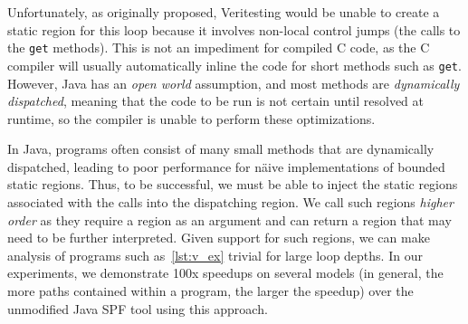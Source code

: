 Unfortunately, as originally proposed, Veritesting would be unable to create a static region for this loop because it involves non-local control jumps (the calls to the \texttt{get} methods).  This is not an impediment for compiled C code, as the C compiler will usually automatically inline the code for short methods such as \texttt{get}.  However, Java has an {\em open world} assumption, and most methods are {\em dynamically dispatched}, meaning that the code to be run is not certain until resolved at runtime, so the compiler is unable to perform these optimizations.

In Java, programs often consist of many small methods that are dynamically dispatched, leading to poor performance for n\"aive implementations of bounded static regions.  Thus, to be successful, we must be able to inject the static regions associated with the calls into the dispatching region.  We call such regions {\em higher order} as they require a region as an argument and can return a region that may need to be further interpreted.
Given support for such regions, we can make analysis of programs such as~\ref{lst:v_ex} trivial for large loop depths.  In our experiments, we demonstrate 100x speedups on several models (in general, the more paths contained within a program, the larger the speedup) over the unmodified Java SPF tool using this approach.
 

